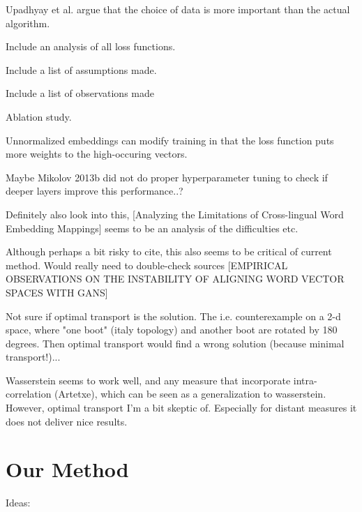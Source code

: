 \documentclass[a4paper,12pt,twoside,openright]{report}
\begin{document}
Upadhyay et al. argue that the choice of data is more important than the actual algorithm.




Include an analysis of all loss functions.

Include a list of assumptions made.

Include a list of observations made

Ablation study.

Unnormalized embeddings can modify training in that the loss function puts more weights to the high-occuring vectors.

Maybe Mikolov 2013b did not do proper hyperparameter tuning to check if deeper layers improve this performance..?

Definitely also look into this, [Analyzing the Limitations of Cross-lingual Word Embedding Mappings] seems to be an analysis of the difficulties etc. 

Although perhaps a bit risky to cite, this also seems to be critical of current method. 
Would really need to double-check sources [EMPIRICAL OBSERVATIONS ON THE INSTABILITY OF ALIGNING WORD VECTOR SPACES WITH GANS]

Not sure if optimal transport is the solution. The i.e. counterexample on a 2-d space, where "one boot" (italy topology) and another boot are rotated by 180 degrees.
Then optimal transport would find a wrong solution (because minimal transport!)...

Wasserstein seems to work well, and any measure that incorporate intra-correlation (Artetxe), which can be seen as a generalization to wasserstein.
However, optimal transport I'm a bit skeptic of. 
Especially for distant measures it does not deliver nice results.

\chapter{Our Method}

Ideas:
\end{document}
